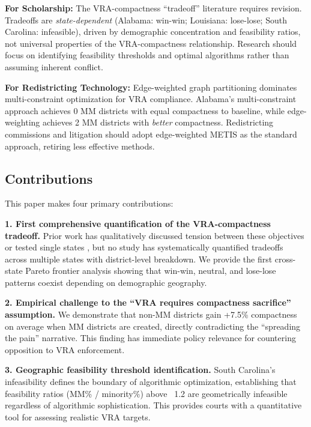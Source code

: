 \textbf{For Scholarship:} The VRA-compactness ``tradeoff'' literature requires revision. Tradeoffs are \emph{state-dependent} (Alabama: win-win; Louisiana: lose-lose; South Carolina: infeasible), driven by demographic concentration and feasibility ratios, not universal properties of the VRA-compactness relationship. Research should focus on identifying feasibility thresholds and optimal algorithms rather than assuming inherent conflict.

\textbf{For Redistricting Technology:} Edge-weighted graph partitioning dominates multi-constraint optimization for VRA compliance. Alabama's multi-constraint approach achieves 0 MM districts with equal compactness to baseline, while edge-weighting achieves 2 MM districts with \emph{better} compactness. Redistricting commissions and litigation should adopt edge-weighted METIS as the standard approach, retiring less effective methods.

\subsection{Contributions}

This paper makes four primary contributions:

\textbf{1. First comprehensive quantification of the VRA-compactness tradeoff.} Prior work has qualitatively discussed tension between these objectives \citep{pildes1993,issacharoff2002} or tested single states \citep{mehrotra1998}, but no study has systematically quantified tradeoffs across multiple states with district-level breakdown. We provide the first cross-state Pareto frontier analysis showing that win-win, neutral, and lose-lose patterns coexist depending on demographic geography.

\textbf{2. Empirical challenge to the ``VRA requires compactness sacrifice'' assumption.} We demonstrate that non-MM districts gain +7.5\% compactness on average when MM districts are created, directly contradicting the ``spreading the pain'' narrative. This finding has immediate policy relevance for countering opposition to VRA enforcement.

\textbf{3. Geographic feasibility threshold identification.} South Carolina's infeasibility defines the boundary of algorithmic optimization, establishing that feasibility ratios (MM\% / minority\%) above ~1.2 are geometrically infeasible regardless of algorithmic sophistication. This provides courts with a quantitative tool for assessing realistic VRA targets.

